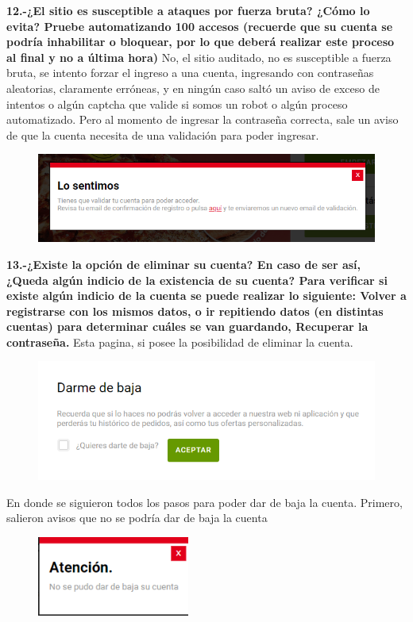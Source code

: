 \documentclass{article}
\begin{document}
\newline
\textbf{12.-¿El sitio es susceptible a ataques por fuerza bruta? ¿Cómo lo evita? Pruebe automatizando 100 accesos (recuerde que su cuenta se podría inhabilitar o bloquear, por lo que deberá realizar este proceso al final y no a última hora)}
\newline
No, el sitio auditado, no es susceptible a fuerza bruta, se intento forzar el ingreso a una cuenta, ingresando con contraseñas aleatorias, claramente erróneas, y en ningún caso saltó un aviso de exceso de intentos o algún captcha que valide si somos un robot o algún proceso automatizado. Pero al momento de ingresar la contraseña correcta, sale un aviso de que la cuenta necesita de una validación para poder ingresar.
\begin{figure}[h!]
    \centering
    \includegraphics[width=15cm]{blokiaeu.PNG}
\end{figure}
\newpage

\textbf{13.-¿Existe la opción de eliminar su cuenta? En caso de ser así, ¿Queda algún indicio de la existencia de su cuenta? Para verificar si existe algún indicio de la cuenta se puede realizar lo siguiente:  Volver a registrarse con los mismos datos, o ir repitiendo datos (en distintas cuentas) para determinar cuáles se van guardando, Recuperar la contraseña.}
\newline
Esta pagina, si posee la posibilidad de eliminar la cuenta. 
\begin{figure}[h!]
    \centering
    \includegraphics[width=15cm]{botarcuenta.PNG}
\end{figure}
\newline 
En donde se siguieron todos los pasos para poder dar de baja la cuenta. Primero, salieron avisos que no se podría dar de baja la cuenta
\begin{figure}[h!]
    \centering
    \includegraphics[width=5cm]{noblok.PNG}
\end{figure}
\newline
\end{document}
